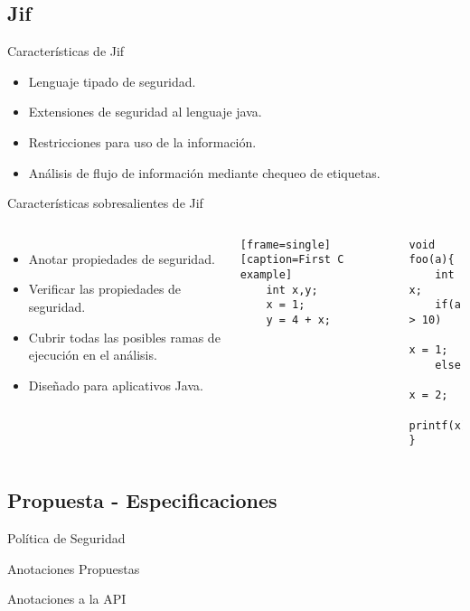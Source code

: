 \subsection{Jif}
\begin{frame}{Características de Jif}
\begin{itemize}
  \item Lenguaje tipado de seguridad.
  \item Extensiones de seguridad al lenguaje java.
  \item Restricciones para uso de la información.
  \item Análisis de flujo de información mediante chequeo de etiquetas.
\end{itemize}
\end{frame}
\begin{frame}[fragile]{Características sobresalientes de Jif}
\begin{columns}[T]
\column{2in}
	\begin{itemize}
	  \item Anotar propiedades de seguridad.
	  \item Verificar las propiedades de seguridad.
	  \item Cubrir todas las posibles ramas de ejecución en el análisis.
	  \item Diseñado para aplicativos Java.
	\end{itemize}
\begin{lstlisting}[style=base][frame=single][caption=First C example]
	int x,y;
	x = 1;	
	y = 4 + x;
\end{lstlisting}
\begin{lstlisting}[style=base]
void foo(a){
	int x;
	if(a > 10)
		x = 1;
	else
		x = 2;
	printf(x);
}
\end{lstlisting}
\end{columns}




\end{frame}

\subsection{Propuesta - Especificaciones}
\begin{frame}{Política de Seguridad}

\end{frame}
\begin{frame}{Anotaciones Propuestas}
	
\end{frame}
\begin{frame}{Anotaciones a la API}
	
\end{frame}
















